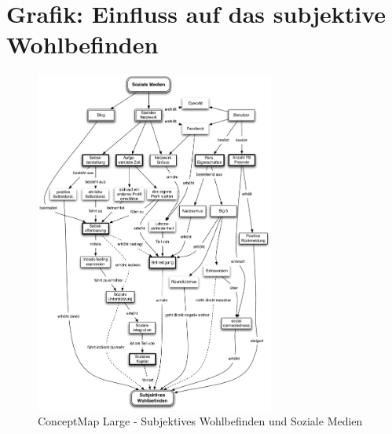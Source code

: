 %
%
\appendix
\let\raggedsection\centering 
{}\label{chap.anhang}
\let\raggedsection\raggedright 

\section{Grafik: Einfluss auf das subjektive Wohlbefinden}\label{sec.anhangGrafik}
\begin{figure}[H]
	\centering
		\includegraphics[width=0.7\textwidth]{images/grafiken/conceptMap_Swb_Sm_v2.pdf}
	\caption{ConceptMap Large - Subjektives Wohlbefinden und Soziale Medien}
	\label{fig.ConceptMapSwbSmAnhang}
\end{figure}

